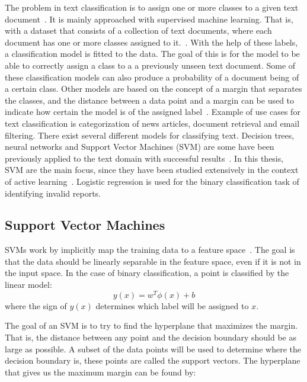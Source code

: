 The problem in text classification is to assign one or more classes to a given text document~\cite{aggarwal2012surveyclass}.
It is mainly approached with supervised machine learning.
That is, with a dataset that consists of a collection of text documents, where each document has one or more classes assigned to it.~\cite{bishop2006pattern}.
With the help of these labels, a classification model is fitted to the data.
The goal of this is for the model to be able to correctly assign a class to a a previously unseen text document.
Some of these classification models can also produce a probability of a document being of a certain class.
Other models are based on the concept of a margin that separates the classes, and the distance between a data point and a margin can be used to indicate how certain the model is of the assigned label~\cite{tong2001support}.
Example of use cases for text classification is categorization of news articles, document retrieval and email filtering.
There exist several different models for classifying text.
Decision trees, neural networks and Support Vector Machines (SVM) are some have been previously applied to the text domain with successful results~\cite{aggarwal2012survey}.
In this thesis, SVM are the main focus, since they have been studied extensively in the context of active learning~\cite{tong2001support, settles2012active, brinker2006active, yang2009effective}.
Logistic regression is used for the binary classification task of identifying invalid reports. %

\subsection{Support Vector Machines}

SVMs work by implicitly map the training data to a feature space~\cite{bishop2006pattern}.
The goal is that the data should be linearly separable in the feature space, even if it is not in the input space.
In the case of binary classification, a point is classified by the linear model:
\begin{equation}\label{eq:svm-y}
    y(x) = w^T \phi(x) + b
\end{equation}
where the sign of $y(x)$ determines which label will be assigned to $x$.

The goal of an SVM is to try to find the hyperplane that maximizes the margin.
That is, the distance between any point and the decision boundary should be as large as possible.
A subset of the data points will be used to determine where the decision boundary is, these points are called the support vectors.
The hyperplane that gives us the maximum margin can be found by:

